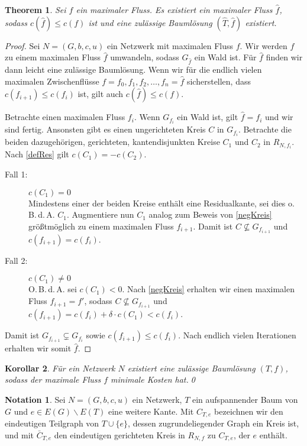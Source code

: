 \documentclass[a4paper,twoside,ngerman]{report}
\theoremstyle{plain}
\newtheorem{thm}{Theorem}
\newtheorem{kor}[thm]{Korollar}
\theoremstyle{definition}
\newtheorem*{nota}{Notation}
\newcommand{\obda}{o.\,B.\,d.\,A. }
\newcommand{\Obda}{O.\,B.\,d.\,A. }
\begin{document}
\begin{thm}Sei $f$ ein maximaler Fluss. Es existiert ein maximaler Fluss $\hat{f}$, sodass $c(\hat{f})\leq c(f)$ ist und eine zulässige Baumlösung $(\hat{T},\hat{f})$ existiert.\end{thm}
\begin{proof}Sei $N=(G,b,c,u)$ ein Netzwerk mit maximalen Fluss $f$. Wir werden $f$ zu einem maximalen Fluss $\hat{f}$ umwandeln, sodass $G_{\hat{f}}$ ein Wald ist. Für $\hat{f}$ finden wir dann leicht eine zulässige Baumlösung. Wenn wir für die endlich vielen maximalen Zwischenflüsse $f=f_0,f_1,f_2,\ldots,f_n=\hat{f}$ sicherstellen, dass $c(f_{i+1})\leq c(f_i)$ ist, gilt auch $c(\hat{f})\leq c(f)$.

Betrachte einen maximalen Fluss $f_i$. Wenn $G_{f_i}$ ein Wald ist, gilt $\hat{f}=f_i$ und wir sind fertig. Ansonsten gibt es einen ungerichteten Kreis $C$ in $G_{f_i}$. Betrachte die beiden dazugehörigen, gerichteten, kantendisjunkten Kreise $C_1$ und $C_2$ in $R_{N,f_i}$. Nach \cref{defRes} gilt $c(C_1)=-c(C_2)$.
\begin{description}
\item[Fall 1:] $c(C_1)=0$\\
	Mindestens einer der beiden Kreise enthält eine Residualkante, sei dies \obda $C_1$. Augmentiere nun $C_1$ analog zum Beweis von \cref{negKreis} größtmöglich zu einem maximalen Fluss $f_{i+1}$. Damit ist $C\nsubseteq G_{f_{i+1}}$ und $c(f_{i+1}) = c(f_i)$.
\item[Fall 2:] $c(C_1)\neq0$\\
	\Obda sei $c(C_1)<0$. Nach \cref{negKreis} erhalten wir einen maximalen Fluss $f_{i+1}=f'$, sodass $C\nsubseteq G_{f_{i+1}}$ und $c(f_{i+1}) = c(f_i) + \delta\cdot c(C_1)<c(f_i)$.
\end{description}

Damit ist $G_{f_{i+1}}\subsetneq G_{f_i}$ sowie $c(f_{i+1})\leq c(f_i)$. Nach endlich vielen Iterationen erhalten wir somit $\hat{f}$.
\end{proof}

\begin{kor}\label{minCostFlow}Für ein Netzwerk $N$ existiert eine zulässige Baumlösung $(T,f)$, sodass der maximale Fluss $f$ minimale Kosten hat.\qed\end{kor}

\begin{nota}Sei $N=(G,b,c,u)$ ein Netzwerk, $T$ ein aufspannender Baum von $G$ und $e\in E(G)\backslash E(T)$ eine weitere Kante. Mit $C_{T,e}$ bezeichnen wir den eindeutigen Teilgraph von $T\cup\{e\}$, dessen zugrundeliegender Graph ein Kreis ist, und mit  $\bar{C}_{T,e}$ den eindeutigen gerichteten Kreis in $R_{N,f}$ zu $C_{T,e}$, der $e$ enthält.\end{nota}
\end{document}
